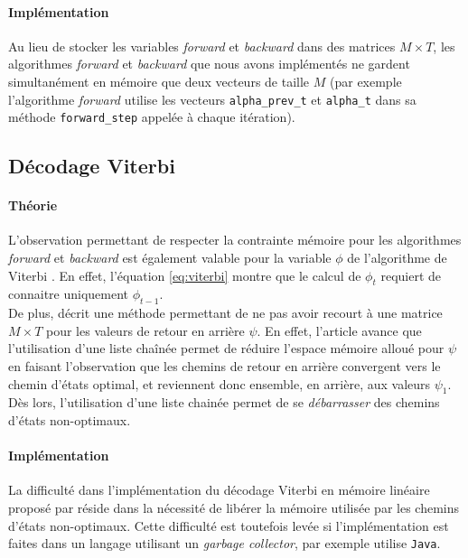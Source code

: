 \documentclass[letterpaper]{article}
\begin{document}
\paragraph{Implémentation}
Au lieu de stocker les variables \textit{forward} et \textit{backward} dans des matrices $M \times T$, les algorithmes \textit{forward} et \textit{backward} que nous avons implémentés ne gardent simultanément en mémoire que deux vecteurs de taille $M$ (par exemple l'algorithme \textit{forward} utilise les vecteurs \texttt{alpha\_prev\_t} et \texttt{alpha\_t} dans sa méthode \texttt{forward\_step} appelée à chaque itération).

\subsection{Décodage Viterbi}
\paragraph{Théorie}
L'observation permettant de respecter la contrainte mémoire pour les algorithmes \textit{forward} et \textit{backward} est également valable pour la variable $\phi$ de l'algorithme de Viterbi \citep{Ch}. En effet, l'équation \ref{eq:viterbi} montre que le calcul de $\phi_t$ requiert de connaitre uniquement $\phi_{t-1}$.  \\

De plus, \cite{Ch} décrit une méthode permettant de ne pas avoir recourt à une matrice $M \times T$ pour les valeurs de retour en arrière $\psi$. En effet, l'article avance que l'utilisation d'une liste chaînée permet de réduire l'espace mémoire alloué pour $\psi$ en faisant l'observation que les chemins de retour en arrière convergent vers le chemin d'états optimal, et reviennent donc ensemble, en arrière, aux valeurs $\psi_1$. Dès lors, l'utilisation d'une liste chainée permet de se \textit{débarrasser} des chemins d'états non-optimaux.

\paragraph{Implémentation}
La difficulté dans l'implémentation du décodage Viterbi en mémoire linéaire proposé par \cite{Ch} réside dans la nécessité de libérer la mémoire utilisée par les chemins d'états non-optimaux. Cette difficulté est toutefois levée si l'implémentation est faites dans un langage utilisant un \textit{garbage collector}, \cite{Ch} par exemple utilise \texttt{Java}. \\
\end{document}
